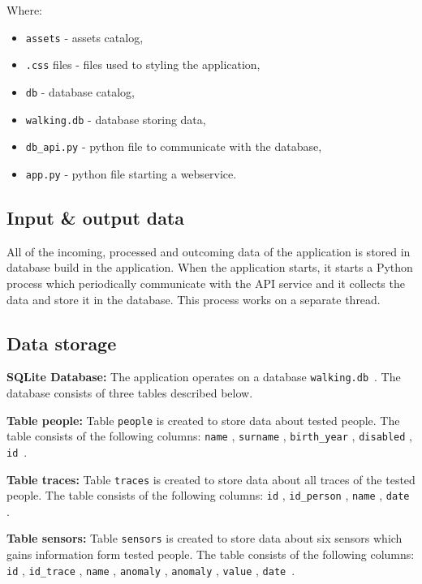 \documentclass[a4paper,12pt,oneside]{article}
\begin{document}
Where: 
\begin{itemize}
    
\item \verb+assets+ - assets catalog,
\item  \par \verb+.css+ files - files used to styling the application,
\item \par \verb+db+ - database catalog,
\item  \par \verb+walking.db+ - database storing data,
\item  \par \verb+db_api.py+ - python file to communicate with the database,
\item  \par \verb+app.py+ - python file starting a webservice.

\end{itemize}
\subsection{Input \& output data}
\newline

All of the incoming, processed and outcoming data of the application is stored in database build in the application. When the application starts, it starts a Python process which periodically communicate with the API service and it collects the data and store it in the database. This process works on a separate thread.

\subsection{Data storage}
\textbf{SQLite Database:}
The application operates on a database \verb+walking.db+~. The database consists of three tables described below.
\newline
\par \textbf{Table people:}
Table \verb+people+ is created to store data about tested people. The table consists of the following columns: \verb+name+ , \verb+surname+ , \verb+birth_year+ , \verb+disabled+ , \verb+id+~.
\newline
\par \textbf{Table traces:}
Table \verb+traces+ is created to store data about all traces of the tested people. The table consists of the following columns: \verb+id+ , \verb+id_person+ , \verb+name+ , \verb+date+ . 
\newline
\par \textbf{Table sensors:}
Table \verb+sensors+ is created to store data about six sensors which gains information form tested people. The table consists of the following columns: \verb+id+ ,  \verb+id_trace+ ,  \verb+name+ ,  \verb+anomaly+ ,  \verb+anomaly+ ,  \verb+value+ ,  \verb+date+~.
\end{document}
